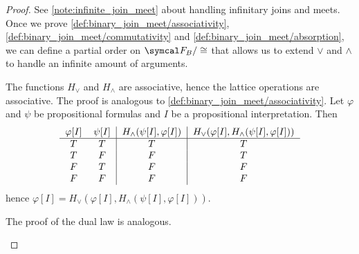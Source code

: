 \begin{proof}
  See \cref{note:infinite_join_meet} about handling infinitary joins and meets. Once we prove \ref{def:binary_join_meet/associativity}, \ref{def:binary_join_meet/commutativity} and \ref{def:binary_join_meet/absorption}, we can define a partial order on \( \Cal{F}_B / \cong \) that allows us to extend \( \lor \) and \( \land \) to handle an infinite amount of arguments.

  \begin{description}
     The functions \( H_\lor \) and \( H_\land \) are associative, hence the lattice operations are associative.
     The proof is analogous to \ref{def:binary_join_meet/associativity}.
     Let \( \varphi \) and \( \psi \) be propositional formulas and \( I \) be a propositional interpretation. Then
    \begin{equation*}
      \begin{tabular}{c c | c | c}
        \( \varphi[I] \) & \( \psi[I] \) & \( H_\land(\psi[I], \varphi[I]) \) & \( H_\lor(\varphi[I], H_\land(\psi[I], \varphi[I])) \) \\
        \hline
        \( T \)          & \( T \)       & \( T \)                            & \( T \)    \\
        \( T \)          & \( F \)       & \( F \)                            & \( T \)    \\
        \( F \)          & \( T \)       & \( F \)                            & \( F \)    \\
        \( F \)          & \( F \)       & \( F \)                            & \( F \)
      \end{tabular}
    \end{equation*}
    hence \( \varphi[I] = H_\lor(\varphi[I], H_\land(\psi[I], \varphi[I])) \).

    The proof of the dual law is analogous.


\end{description}
\end{proof}
